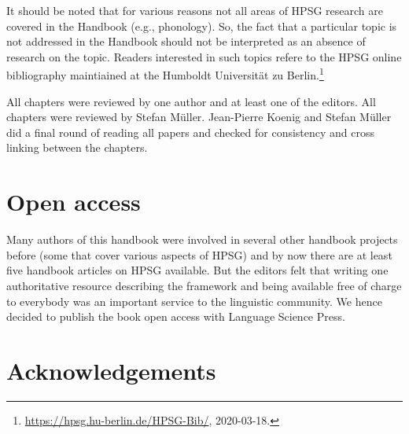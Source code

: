 \begin{refsection}
It should be noted that for various reasons not all areas of HPSG research are covered in the
Handbook (e.g., phonology). So, the fact that a particular topic is not addressed in the Handbook
should not be interpreted as an absence of research on the topic. Readers interested in such topics
refere to the HPSG online bibliography maintiained at the Humboldt Universität zu Berlin.\footnote{%
\url{https://hpsg.hu-berlin.de/HPSG-Bib/}, 2020-03-18.
}

All chapters were reviewed by one author and at least one of the editors. All chapters were reviewed
by Stefan Müller. Jean-Pierre Koenig and Stefan Müller did a final round of reading all papers and
checked for consistency and cross linking between the chapters.


\section*{Open access}


Many authors of this handbook were involved in several other handbook projects before (some that cover various aspects of HPSG) and by now there are at least five handbook articles on HPSG available. But the editors felt that writing one authoritative resource describing the framework and being available free of charge to everybody was an important service to the linguistic community. We hence decided to publish the book open access with Language Science Press.


\section*{Acknowledgements}


\end{refsection}
